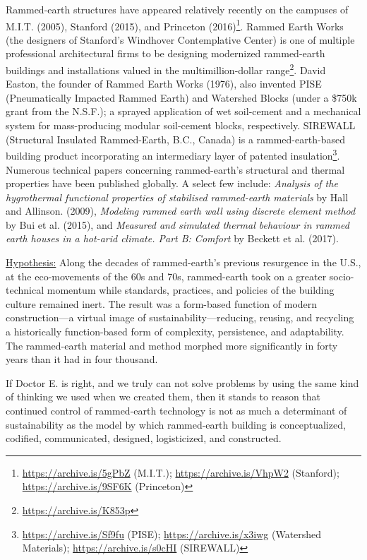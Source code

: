 Rammed-earth structures have appeared relatively recently on the campuses of M.I.T. (2005), Stanford (2015), and Princeton (2016)\footnote{\url{https://archive.is/5gPbZ} (M.I.T.); \url{https://archive.is/VhpW2} (Stanford); \url{https://archive.is/9SF6K} (Princeton)}. Rammed Earth Works (the designers of Stanford's Windhover Contemplative Center) is one of multiple professional architectural firms to be designing modernized rammed-earth buildings and installations valued in the multimillion-dollar range\footnote{\url{https://archive.is/K853p}}. David Easton, the founder of Rammed Earth Works (1976), also invented PISE (Pneumatically Impacted Rammed Earth) and Watershed Blocks (under a \$750k grant from the N.S.F.); a sprayed application of wet soil-cement and a mechanical system for mass-producing modular soil-cement blocks, respectively. SIREWALL (Structural Insulated Rammed-Earth, B.C., Canada) is a rammed-earth-based building product incorporating an intermediary layer of patented insulation\footnote{\url{https://archive.is/Sf9fu} (PISE); \url{https://archive.is/x3iwg} (Watershed Materials); \url{https://archive.is/s0cHI} (SIREWALL)}. Numerous technical papers concerning rammed-earth's structural and thermal properties have been published globally. A select few include: \textit{Analysis of the hygrothermal functional properties of stabilised rammed-earth materials} by Hall and Allinson. (2009), \textit{Modeling rammed earth wall using discrete element method} by Bui et al. (2015), and \textit{Measured and simulated thermal behaviour in rammed earth houses in a hot-arid climate. Part B: Comfort} by Beckett et al. (2017).

\vspace{5mm}

\underline{Hypothesis:} Along the decades of rammed-earth's previous resurgence in the U.S., at the eco-movements of the 60s and 70s, rammed-earth took on a greater socio-technical momentum while standards, practices, and policies of the building culture remained inert. The result was a form-based function of modern construction---a virtual image of sustainability---reducing, reusing, and recycling a historically function-based form of complexity, persistence, and adaptability. The rammed-earth material and method morphed more significantly in forty years than it had in four thousand.

If Doctor E. is right, and we truly can not solve problems by using the same kind of thinking we used when we created them, then it stands to reason that continued control of rammed-earth technology is not as much a determinant of sustainability as the model by which rammed-earth building is conceptualized, codified, communicated, designed, logisticized, and constructed.

